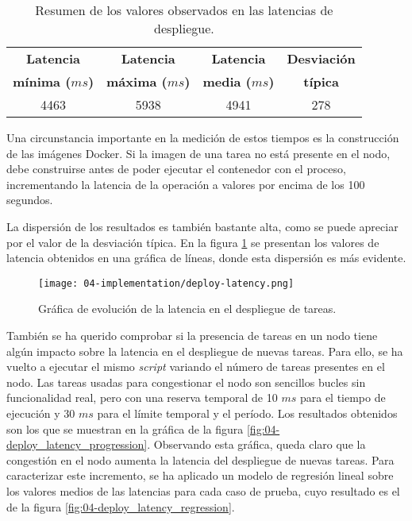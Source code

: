 \begin{table}
    \centering
    \begin{tabular}{ | c | c | c | c | }
        \hline
        \textbf{Latencia}      & \textbf{Latencia}      & \textbf{Latencia}     & \textbf{Desviación} \\
        \textbf{mínima ($ms$)} & \textbf{máxima ($ms$)} & \textbf{media ($ms$)} & \textbf{típica}     \\
        \hline
        4463                   & 5938                   & 4941                  & 278                 \\
        \hline
    \end{tabular}
    \caption{Resumen de los valores observados en las latencias de despliegue.}
    \label{tab:04-deploy_latency}
\end{table}

Una circunstancia importante en la medición de estos tiempos es la construcción
de las imágenes Docker. Si la imagen de una tarea no está presente en el nodo, debe
construirse antes de poder ejecutar el contenedor con el proceso, incrementando
la latencia de la operación a valores por encima de los 100 segundos.

La dispersión de los resultados es también bastante alta, como se puede apreciar
por el valor de la desviación típica. En la figura \ref{fig:04-deploy_latency} se
presentan los valores de latencia obtenidos en una gráfica de líneas, donde esta
dispersión es más evidente.

\begin{figure}
    \centering
    \texttt{[image: 04-implementation/deploy-latency.png]}
    \caption{Gráfica de evolución de la latencia en el despliegue de tareas.}
    \label{fig:04-deploy_latency}
\end{figure}

También se ha querido comprobar si la presencia de tareas en un nodo tiene algún
impacto sobre la latencia en el despliegue de nuevas tareas. Para ello, se ha
vuelto a ejecutar el mismo \textit{script} variando el número de tareas
presentes en el nodo. Las tareas usadas para congestionar el nodo son sencillos
bucles sin funcionalidad real, pero con una reserva temporal de 10 $ms$ para el
tiempo de ejecución y 30 $ms$ para el límite temporal y el período. Los
resultados obtenidos son los que se muestran en la gráfica de la figura
\ref{fig:04-deploy_latency_progression}. Observando esta gráfica, queda claro
que la congestión en el nodo aumenta la latencia del despliegue de nuevas
tareas. Para caracterizar este incremento, se ha aplicado un modelo de regresión
lineal sobre los valores medios de las latencias para cada caso de prueba, cuyo
resultado es el de la figura \ref{fig:04-deploy_latency_regression}.

